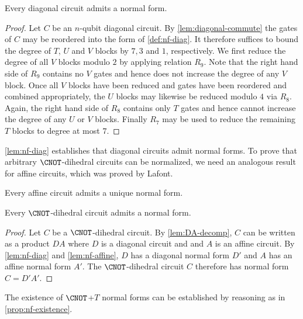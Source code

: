 \documentclass{eptcs}
\begin{document}
\begin{lemma}
  \label{lem:nf-diag}
  Every diagonal circuit admits a normal form.
\end{lemma}

\begin{proof}
  Let $C$ be an $n$-qubit diagonal circuit. By
  \cref{lem:diagonal-commute} the gates of $C$ may be reordered into
  the form of \cref{def:nf-diag}. It therefore suffices to bound the
  degree of $T$, $U$ and $V$ blocks by $7, 3$ and $1$,
  respectively. We first reduce the degree of all $V$ blocks modulo
  $2$ by applying relation $R_9$. Note that the right hand side of
  $R_9$ contains no $V$ gates and hence does not increase the degree
  of any $V$ block. Once all $V$ blocks have been reduced and gates
  have been reordered and combined appropriately, the $U$ blocks may
  likewise be reduced modulo $4$ via $R_8$. Again, the right hand side
  of $R_8$ contains only $T$ gates and hence cannot increase the
  degree of any $U$ or $V$ blocks.  Finally $R_7$ may be used to
  reduce the remaining $T$ blocks to degree at most $7$.
\end{proof}

\cref{lem:nf-diag} establishes that diagonal circuits admit normal
forms. To prove that arbitrary $\CNOT$-dihedral circuits can be
normalized, we need an analogous result for affine circuits, which was
proved by Lafont.

\begin{lemma}
  \label{lem:nf-affine}
  Every affine circuit admits a unique normal form.
\end{lemma}

\begin{proposition}
  \label{prop:nf-existence}
  Every $\CNOT$-dihedral circuit admits a normal form.
\end{proposition}

\begin{proof}
  Let $C$ be a $\CNOT$-dihedral circuit. By \cref{lem:DA-decomp}, $C$
  can be written as a product $DA$ where $D$ is a diagonal circuit and
  and $A$ is an affine circuit. By \cref{lem:nf-diag} and
  \cref{lem:nf-affine}, $D$ has a diagonal normal form $D'$ and $A$
  has an affine normal form $A'$. The $\CNOT$-dihedral circuit $C$
  therefore has normal form $C=D'A'$.
\end{proof}

\begin{remark}
  \label{rem:cnott-existence}
  The existence of $\CNOT$+$T$ normal forms can be established by
  reasoning as in \cref{prop:nf-existence}.
\end{remark}
\end{document}
